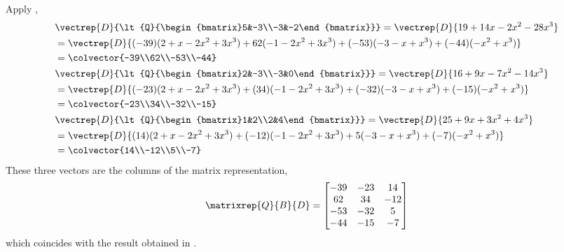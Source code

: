 Apply ,
%
\begin{align*}
&\vectrep{D}{\lt{Q}{\begin{bmatrix}5&-3\\-3&-2\end{bmatrix}}}
=\vectrep{D}{19+14x-2x^2-28x^3}\\
&=\vectrep{D}{(-39)(2+x-2x^2+3x^3)+62(-1-2x^2+3x^3)+(-53)(-3-x+x^3)+(-44)(-x^2+x^3)}\\
&=\colvector{-39\\62\\-53\\-44}\\
%
&\vectrep{D}{\lt{Q}{\begin{bmatrix}2&-3\\-3&0\end{bmatrix}}}
=\vectrep{D}{16+9x-7x^2-14x^3}\\
&=\vectrep{D}{(-23)(2+x-2x^2+3x^3)+(34)(-1-2x^2+3x^3)+(-32)(-3-x+x^3)+(-15)(-x^2+x^3)}\\
&=\colvector{-23\\34\\-32\\-15}\\
%
&\vectrep{D}{\lt{Q}{\begin{bmatrix}1&2\\2&4\end{bmatrix}}}
=\vectrep{D}{25+9x+3x^2+4x^3}\\
&=\vectrep{D}{(14)(2+x-2x^2+3x^3)+(-12)(-1-2x^2+3x^3)+5(-3-x+x^3)+(-7)(-x^2+x^3)}\\
&=\colvector{14\\-12\\5\\-7}\\
%
\end{align*}
%
These three vectors are the columns of the matrix representation,
%
\begin{equation*}
\matrixrep{Q}{B}{D}=
\begin{bmatrix}
 -39 & -23 & 14 \\
 62 & 34 & -12 \\
 -53 & -32 & 5 \\
 -44 & -15 & -7
\end{bmatrix}
\end{equation*}
%
which coincides with the result obtained in .